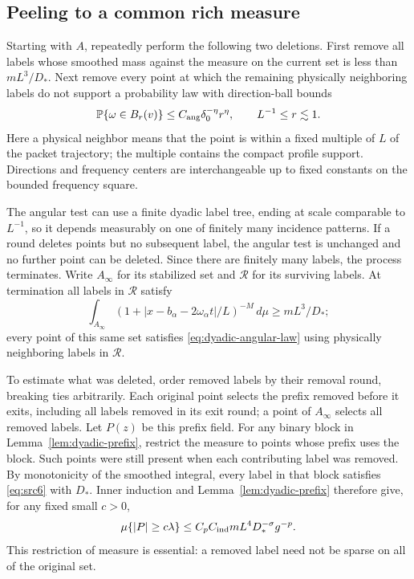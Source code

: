 \subsection{Peeling to a common rich measure}

Starting with $A$, repeatedly perform the following two deletions.
First remove all labels whose smoothed mass against the measure on the
current set is less than $mL^3/D_*$.  Next remove every point at which
the remaining physically neighboring labels do not support a probability
law with direction-ball bounds
\begin{equation}\label{eq:dyadic-angular-law}
 \mathbb P\{\omega\in B_r(v)\}
 \leq C_{\rm ang}\delta_0^{-\eta}r^\eta,
 \qquad L^{-1}\leq r\lesssim1.
\end{equation}
Here a physical neighbor means that the point is within a fixed multiple
of $L$ of the packet trajectory; the multiple contains the compact
profile support.  Directions and frequency centers are interchangeable
up to fixed constants on the bounded frequency square.

The angular test can use a finite dyadic label tree, ending at scale
comparable to $L^{-1}$, so it depends measurably on one of finitely many
incidence patterns.  If a round deletes points but no subsequent label,
the angular test is unchanged and no further point can be deleted.
Since there are finitely many labels, the process terminates.  Write
$A_\infty$ for its stabilized set and $\mathcal R$ for its surviving
labels.  At termination all labels in $\mathcal R$ satisfy
\begin{equation}\label{eq:dyadic-rich-common}
 \int_{A_\infty}
 (1+|x-b_\alpha-2\omega_\alpha t|/L)^{-M}\,d\mu
 \geq mL^3/D_*;
\end{equation}
every point of this same set satisfies \eqref{eq:dyadic-angular-law}
using physically neighboring labels in $\mathcal R$.

To estimate what was deleted, order removed labels by their removal
round, breaking ties arbitrarily.  Each original point selects the
prefix removed before it exits, including all labels removed in its exit
round; a point of $A_\infty$ selects all removed labels.  Let $P(z)$ be
this prefix field.  For any binary block in
Lemma~\ref{lem:dyadic-prefix}, restrict the measure to points whose
prefix uses the block.  Such points were still present when each
contributing label was removed.  By monotonicity of the smoothed
integral, every label in that block satisfies \eqref{eq:src6} with
$D_*$.  Inner induction and Lemma~\ref{lem:dyadic-prefix} therefore
give, for any fixed small $c>0$,
\begin{equation}\label{eq:dyadic-prefix-exception}
 \mu\{|P|\geq c\lambda\}
 \leq C_p C_{\rm ind}mL^4D_*^{-\sigma}g^{-p}.
\end{equation}
This restriction of measure is essential: a removed label need not be
sparse on all of the original set.

